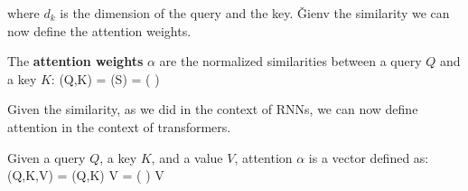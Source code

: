 where $d_k$ is the dimension of the query and the key. \v

Gienv the similarity we can now define the attention weights.

The \textbf{attention weights} $\alpha$ are the normalized similarities between a query $Q$ and a key $K$:
\bse
\alpha(Q,K) = (S) = \Big(  \Big)
\ese
\ed

Given the similarity, as we did in the context of RNNs, we can now define attention in the context of transformers.

\bd[Attention]
Given a query $Q$, a key $K$, and a value $V$, attention $\alpha$ is a vector defined as:
\bse
\boldsymbol{\alpha}(Q,K,V) = \alpha(Q,K) \times V = \Big(  \Big) \times V
\ese
\ed

